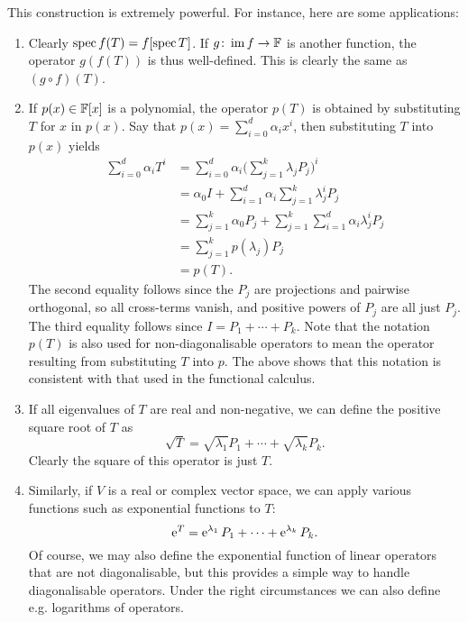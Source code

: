 This construction is extremely powerful. For instance, here are some applications:
%
\begin{enumerate}
    \item Clearly $\operatorname{spec} f(T) = f[\operatorname{spec} T]$. If $g \colon \operatorname{im} f \to \mathbb{F}$ is another function, the operator $g(f(T))$ is thus well-defined. This is clearly the same as $(g \circ f)(T)$.

    \item If $p(x) \in \mathbb{F}[x]$ is a polynomial, the operator $p(T)$ is obtained by substituting $T$ for $x$ in $p(x)$. Say that $p(x) = \sum_{i=0}^d \alpha_i x^i$, then substituting $T$ into $p(x)$ yields
    \begin{align*}
        \sum_{i=0}^d \alpha_i T^i
            &= \sum_{i=0}^d \alpha_i \bigg( \sum_{j=1}^k \lambda_j P_j \bigg)^i \\
            &= \alpha_0 I + \sum_{i=1}^d \alpha_i \sum_{j=1}^k \lambda_j^i P_j \\
            &= \sum_{j=1}^k \alpha_0 P_j + \sum_{j=1}^k \sum_{i=1}^d \alpha_i \lambda_j^i P_j \\
            &= \sum_{j=1}^k p(\lambda_j) P_j \\
            &= p(T).
    \end{align*}
    The second equality follows since the $P_j$ are projections and pairwise orthogonal, so all cross-terms vanish, and positive powers of $P_j$ are all just $P_j$. The third equality follows since $I = P_1 + \cdots + P_k$. Note that the notation $p(T)$ is also used for non-diagonalisable operators to mean the operator resulting from substituting $T$ into $p$. The above shows that this notation is consistent with that used in the functional calculus.

    \item If all eigenvalues of $T$ are real and non-negative, we can define the positive square root of $T$ as
    \begin{equation*}
        \sqrt{T}
            = \sqrt{\lambda_1} P_1 + \cdots + \sqrt{\lambda_k} P_k.
    \end{equation*}
    Clearly the square of this operator is just $T$.

    \item Similarly, if $V$ is a real or complex vector space, we can apply various functions such as exponential functions to $T$:
    \begin{equation*}
        \operatorname{\mathrm{e}}^T
            = \operatorname{\mathrm{e}}^{\lambda_1} P_1 + \cdots + \operatorname{\mathrm{e}}^{\lambda_k} P_k.
    \end{equation*}
    Of course, we may also define the exponential function of linear operators that are not diagonalisable, but this provides a simple way to handle diagonalisable operators. Under the right circumstances we can also define e.g. logarithms of operators.
\end{enumerate}


